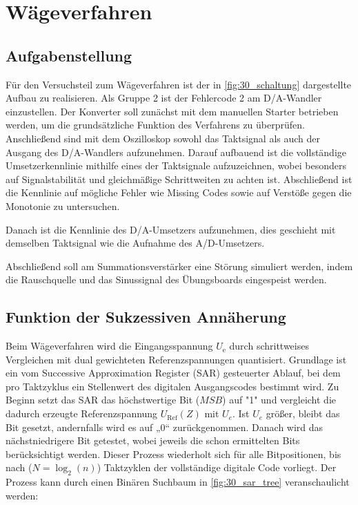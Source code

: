 \newpage
\section{Wägeverfahren}


\subsection{Aufgabenstellung}\label{sec:30_aufgabenstellung}
Für den Versuchsteil zum Wägeverfahren ist der in \autoref{fig:30_schaltung} dargestellte Aufbau zu realisieren. Als Gruppe 2 ist der Fehlercode 2 am D/A-Wandler einzustellen. Der Konverter soll zunächst mit dem manuellen Starter betrieben werden, um die grundsätzliche Funktion des Verfahrens zu überprüfen. Anschließend sind mit dem Oszilloskop sowohl das Taktsignal als auch der Ausgang des D/A-Wandlers aufzunehmen. Darauf aufbauend ist die vollständige Umsetzerkennlinie mithilfe eines der Taktsignale aufzuzeichnen, wobei besonders auf Signalstabilität und gleichmäßige Schrittweiten zu achten ist. Abschließend ist die Kennlinie auf mögliche Fehler wie Missing Codes sowie auf Verstöße gegen die Monotonie zu untersuchen.

Danach ist die Kennlinie des D/A-Umsetzers aufzunehmen, dies geschieht mit demselben Taktsignal wie die Aufnahme des A/D-Umsetzers.

Abschließend soll am Summationsverstärker eine Störung simuliert werden, indem die Rauschquelle und das Sinussignal des Übungsboards eingespeist werden.

\subsection{Funktion der Sukzessiven Annäherung}

Beim Wägeverfahren wird die Eingangsspannung $U_\mathrm{e}$ durch schrittweises Vergleichen mit dual gewichteten Referenzspannungen quantisiert. Grundlage ist ein vom Successive Approximation Register (SAR) gesteuerter Ablauf, bei dem pro Taktzyklus ein Stellenwert des digitalen Ausgangscodes bestimmt wird. Zu Beginn setzt das SAR das höchstwertige Bit ($MSB$) auf "1" und vergleicht die dadurch erzeugte Referenzspannung $U_\text{Ref}(Z)$ mit $U_e$. Ist $U_e$ größer, bleibt das Bit gesetzt, andernfalls wird es auf „0“ zurückgenommen. Danach wird das nächstniedrigere Bit getestet, wobei jeweils die schon ermittelten Bits berücksichtigt werden. Dieser Prozess wiederholt sich für alle Bitpositionen, bis nach ($N = \log_2(n)$) Taktzyklen der vollständige digitale Code vorliegt. Der Prozess kann durch einen Binären Suchbaum in \autoref{fig:30_sar_tree} veranschaulicht werden:

